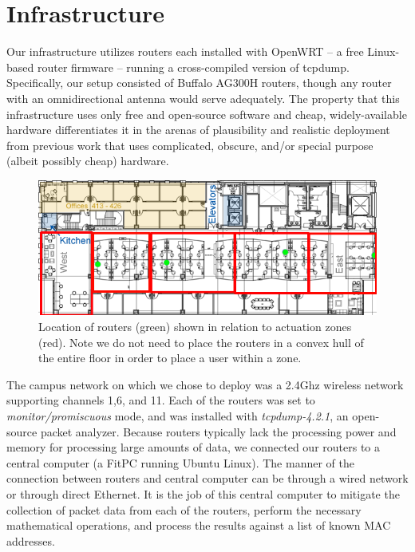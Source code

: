 \section{Infrastructure}
Our infrastructure utilizes routers each installed with OpenWRT -- a free Linux-based router firmware -- running a cross-compiled version of tcpdump.  Specifically, our setup consisted of Buffalo AG300H routers, though any router with an omnidirectional antenna would serve adequately. The property that this infrastructure uses only free and open-source software and cheap, widely-available hardware differentiates it in the arenas of plausibility and realistic deployment from previous work that uses complicated, obscure, and/or special purpose (albeit possibly cheap) hardware. 

\begin{figure}[htb]
\begin{center}
\includegraphics[width=\linewidth]{figs/floor4}
\end{center}
\caption{Location of routers (green) shown in relation to actuation zones (red). Note we do not need to place the routers in a convex hull of the entire floor in order to place a user within a zone.}
\end{figure}

The campus network on which we chose to deploy was a 2.4Ghz wireless network supporting channels 1,6, and 11. Each of the routers was set to \emph{monitor/promiscuous} mode, and was installed with \emph{tcpdump-4.2.1}, an open-source packet analyzer. Because routers typically lack the processing power and memory for processing large amounts of data, we connected our routers to a central computer (a FitPC running Ubuntu Linux). The manner of the connection between routers and central computer can be through a wired network or through direct Ethernet. It is the job of this central computer to mitigate the collection of packet data from each of the routers, perform the necessary mathematical operations, and process the results against a list of known MAC addresses. 

